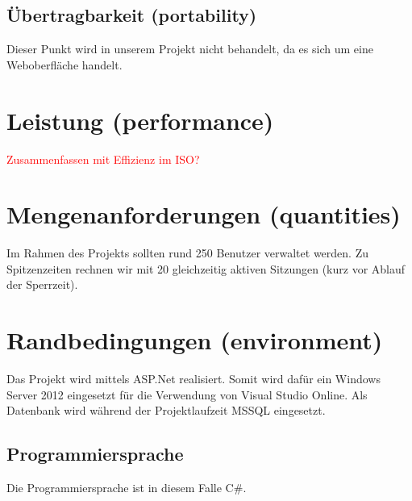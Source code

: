 	\subsection{Übertragbarkeit (portability)}
	Dieser Punkt wird in unserem Projekt nicht behandelt, da es sich um eine Weboberfläche handelt.
	
	\section{Leistung (performance)}
	\textcolor{red}{Zusammenfassen mit Effizienz im ISO? }
	\section{Mengenanforderungen (quantities)}
	Im Rahmen des Projekts sollten rund 250 Benutzer verwaltet werden.  Zu Spitzenzeiten rechnen wir mit 20 gleichzeitig aktiven Sitzungen (kurz vor Ablauf der Sperrzeit). 
		
	\section{Randbedingungen (environment)}
	Das Projekt wird mittels ASP.Net realisiert. Somit wird dafür ein Windows Server 2012 eingesetzt für die Verwendung von Visual Studio Online. Als Datenbank wird während der Projektlaufzeit MSSQL eingesetzt.
	\subsection {Programmiersprache}
	Die Programmiersprache ist in diesem Falle C\#.

	
